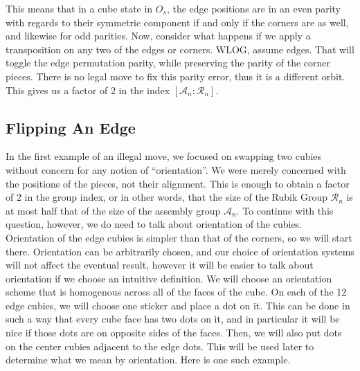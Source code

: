 \documentclass[10pt,letterpaper]{report}
\begin{document}
This means that in a cube state in $O_s$, the edge positions are in an even parity with regards to their symmetric component if and only if the corners are as well, and likewise for odd parities.  Now, consider what happens if we apply a transposition on any two of the edges or corners.  WLOG, assume edges.  That will toggle the edge permutation parity, while preserving the parity of the corner pieces.  There is no legal move to fix this parity error, thus it is a different orbit.  This gives us a factor of 2 in the index $[\mathcal{A}_n : \mathcal{R}_n]$.

\subsection{Flipping An Edge}

In the first example of an illegal move, we focused on swapping two cubies without concern for any notion of ``orientation''.  We were merely concerned with the positions of the pieces, not their alignment.  This is enough to obtain a factor of 2 in the group index, or in other words, that the size of the Rubik Group $\mathcal{R}_n$ is at most half that of the size of the assembly group $\mathcal{A}_n$.  To continue with this question, however, we do need to talk about orientation of the cubies. \\

Orientation of the edge cubies is simpler than that of the corners, so we will start there.  Orientation can be arbitrarily chosen, and our choice of orientation systems will not affect the eventual result, however it will be easier to talk about orientation if we choose an intuitive definition.  We will choose an orientation scheme that is homogenous across all of the faces of the cube.  On each of the 12 edge cubies, we will choose one sticker and place a dot on it.  This can be done in such a way that every cube face has two dots on it, and in particular it will be nice if those dots are on opposite sides of the faces.  Then, we will also put dots on the center cubies adjacent to the edge dots.  This will be used later to determine what we mean by orientation.  Here is one such example.
\end{document}
